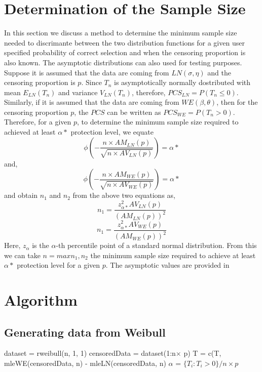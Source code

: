 \documentclass[twoside]{article}
\begin{document}
\begin{multicols}{2}
\section{Determination of the Sample Size}
 In this section we discuss a method to determine the minimum sample size needed to discrimante between the two distribution functions for a given user specified probability of correct selection and when the censoring proportion is also known. The asymptotic distributions can also used for testing purposes.
 Suppose it is assumed that the data are coming from $LN(\sigma,\eta)$ and the censoring proportion is $p$. Since $T_n$ is asymptotically normally dostributed with mean $E_{LN}(T_n)$ and variance $V_{LN}(T_n)$, therefore, $PCS_{LN}=P(T_{n}\leq 0)$. Similarly, if it is assumed that the data are coming from $WE(\beta,\theta)$, then for the censoring proportion $p$, the $PCS$ can be written as $PCS_{WE}=P(T_{n}>0)$. Therefore, for a given $p$, to determine the minimum sample size required to achieved at least $\alpha*$ protection level, we equate
\begin{equation}
\phi\left(-\frac{n\times AM_{LN}(p)}{\sqrt{n\times AV_{LN}(p)}}\right)=\alpha*
\end{equation}
 and,
\begin{equation}
\phi\left(-\frac{n\times AM_{WE}(p)}{\sqrt{n\times AV_{WE}(p)}}\right)=\alpha*
\end{equation}
and obtain $n_1$ and $n_2$ from the above two equations as,
\begin{equation}
n_1=\frac{z_{\alpha*}^{2}AV_{LN}(p)}{(AM_{LN}(p))^2}
\end{equation}
\begin{equation}
n_1=\frac{z_{\alpha*}^{2}AV_{WE}(p)}{(AM_{WE}(p))^2}
\end{equation} 
Here, $z_\alpha$ is the $\alpha$-th percentile point of a standard normal distribution. From this we can take $n=max{n_1,n_2}$ the minimum sample size required to achieve at least $\alpha*$ protection level for a given $p$. The asymptotic values are provided in 
\section{Algorithm}
\subsection{Generating data from Weibull}
\begin{algorithm}[H]
  dataset = rweibull(n, 1, 1)\;
  censoredData = dataset(1:n$\times$ p)\;
  T = c(T, mleWE(censoredData, n) - mleLN(censoredData, n)\;
  $\alpha$ = $\{T_i : T_i > 0\}/n\times p$\;
\end{algorithm}



\end{multicols}
\end{document}
